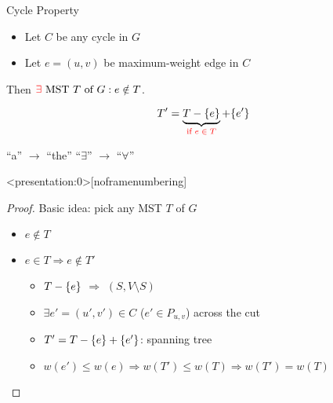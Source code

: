 
\begin{frame}{}
  \centerline{}
\end{frame}

\begin{frame}{}
  \begin{block}{Cycle Property }
    \begin{itemize}
      \item Let $C$ be any cycle in $G$
      \item Let $e = (u,v)$ be  maximum-weight edge in $C$
    \end{itemize}

    \centerline{Then $\textcolor{red}{\exists} \text{ MST } T \text{ of } G: e \notin T$.}
  \end{block}


  \pause
  \vspace{-0.30cm}
  \[
    T' = \underbrace{T - \{e\}}_{\textcolor{red}{\text{if } e \;\in\; T}} + \{e'\}
  \]

  \pause
  \centerline{``a'' $\to$ ``the'' \red{$\implies$} ``$\exists$'' $\to$ ``$\forall$''}
\end{frame}

\begin{frame}<presentation:0>[noframenumbering]
  \begin{proof}
    Basic idea: pick any MST $T$ of $G$
    \begin{itemize}
      \item $e \notin T$
      \item $e \in T \Rightarrow e \notin T'$
	\begin{itemize}
	  \item $T - \{e\}$ $\Rightarrow$ $(S, V \setminus S)$
	  \item $\exists e' = (u', v') \in C$ ($e' \in P_{u,v}$) across the cut
	  \item \textcolor{red}{$T' = T - \{e\} + \{e'\}$}: spanning tree
	  \item $w(e') \leq w(e) \Rightarrow w(T') \leq w(T) \Rightarrow w(T') = w(T)$
	\end{itemize}
    \end{itemize}
  \end{proof}
\end{frame}

